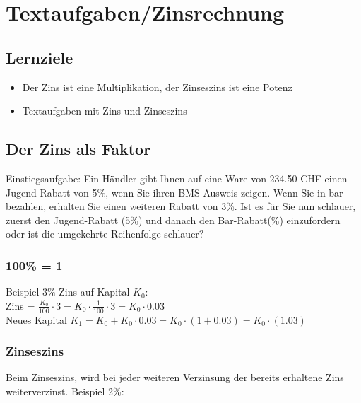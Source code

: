 
\newpage
\section{Textaufgaben/Zinsrechnung}
\subsection*{Lernziele}

\begin{itemize}
  \item Der Zins ist eine  Multiplikation, der Zinseszins ist eine Potenz
\item Textaufgaben mit Zins und Zinseszins
\end{itemize}

\subsection{Der Zins als Faktor}
Einstiegsaufgabe:
Ein Händler gibt Ihnen auf eine Ware von 234.50 CHF einen Jugend-Rabatt von
5\%, wenn Sie ihren BMS-Ausweis zeigen. Wenn Sie in bar bezahlen, erhalten Sie
einen weiteren Rabatt von 3\%. Ist es für Sie nun schlauer, zuerst den
Jugend-Rabatt (5\%) und danach den Bar-Rabatt(\%) einzufordern oder
ist die umgekehrte Reihenfolge schlauer? 

\subsubsection{100\% = 1}
Beispiel $3\%$ Zins auf Kapital $K_0$:\\
Zins = $\frac{K_0}{100}\cdot 3 = K_0\cdot{}\frac1{100}\cdot{3} = K_0 \cdot 0.03$\\
Neues Kapital $K_1 = K_0 + K_0\cdot 0.03 = K_0\cdot{}(1+0.03) = K_0\cdot{}(1.03)$


\subsubsection{Zinseszins}
Beim Zinseszins, wird bei jeder weiteren Verzinsung der bereits
erhaltene Zins weiterverzinst. Beispiel 2\%:

